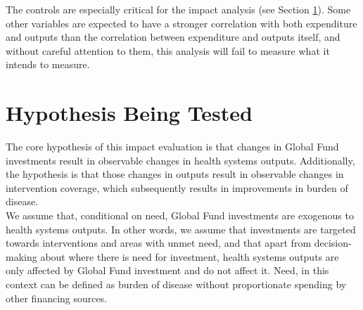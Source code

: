 \documentclass[twocolumn]{bmcart}%
\begin{document}
The controls are especially critical for the impact analysis (see Section \ref{hypothesis}). Some other variables are expected to have a stronger correlation with both expenditure and outputs than the correlation between expenditure and outputs itself, and without careful attention to them, this analysis will fail to measure what it intends to measure.








\section{Hypothesis Being Tested} \label{hypothesis}

The core hypothesis of this impact evaluation is that changes in Global Fund investments result in observable changes in health systems outputs. Additionally, the hypothesis is that those changes in outputs result in observable changes in intervention coverage, which subsequently results in improvements in burden of disease. \\

We assume that, conditional on need, Global Fund investments are exogenous to health systems outputs. In other words, we assume that investments are targeted towards interventions and areas with unmet need, and that apart from decision-making about where there is need for investment, health systems outputs are only affected by Global Fund investment and do not affect it. Need, in this context can be defined as burden of disease without proportionate spending by other financing sources. \\
\end{document}

